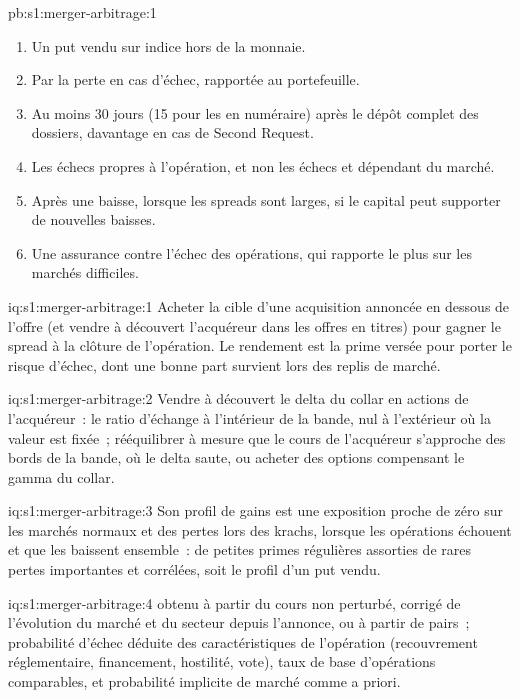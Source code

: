 \begin{solution}{pb:s1:merger-arbitrage:1}
\begin{enumerate}
\item Un put vendu sur indice hors de la monnaie.
\item Par la perte en cas d'échec, rapportée au portefeuille.
\item Au moins 30 jours (15 pour les  en numéraire) après le dépôt complet des dossiers, davantage en cas de Second Request.
\item Les échecs propres à l'opération, et non les échecs et  dépendant du marché.
\item Après une baisse, lorsque les spreads sont larges, si le capital peut supporter de nouvelles baisses.
\item Une assurance contre l'échec des opérations, qui rapporte le plus sur les marchés difficiles.
\end{enumerate}
\end{solution}

\begin{solution}{iq:s1:merger-arbitrage:1}
Acheter la cible d'une acquisition annoncée en dessous de l'offre (et vendre à découvert l'acquéreur dans les offres en titres) pour gagner le spread à la clôture de l'opération. Le rendement
est la prime versée pour porter le risque d'échec, dont une bonne part survient lors des replis de marché.
\end{solution}

\begin{solution}{iq:s1:merger-arbitrage:2}
Vendre à découvert le delta du collar en actions de l'acquéreur~: le ratio d'échange à l'intérieur de la bande, nul à l'extérieur où la valeur est fixée~; rééquilibrer à mesure que le cours de l'acquéreur
s'approche des bords de la bande, où le delta saute, ou acheter des options compensant le gamma du collar.
\end{solution}

\begin{solution}{iq:s1:merger-arbitrage:3}
Son profil de gains est une exposition proche de zéro sur les marchés normaux et des pertes lors des krachs, lorsque les opérations échouent et que les  baissent ensemble~: de petites primes régulières assorties de rares
pertes importantes et corrélées, soit le profil d'un put vendu.
\end{solution}

\begin{solution}{iq:s1:merger-arbitrage:4}
 obtenu à partir du cours non perturbé, corrigé de l'évolution du marché et du secteur depuis l'annonce, ou à partir de pairs~; probabilité d'échec déduite des caractéristiques de l'opération
(recouvrement réglementaire, financement, hostilité, vote), taux de base d'opérations comparables, et probabilité implicite de marché comme a priori.
\end{solution}

